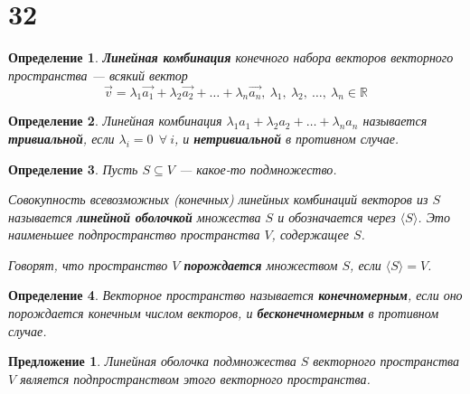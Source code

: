 \documentclass[a4paper,12pt]{article}
\newtheorem*{definition}{Определение}
\newtheorem*{proposal}{Предложение}
\begin{document}
	\section*{32}
	\begin{definition}
		\textbf{Линейная комбинация} конечного набора векторов векторного пространства --- всякий вектор \[\vec v =  \lambda_1\vec{a_1} + \lambda_2\vec{a_2} + \ldots + \lambda_n\vec{a_n},\ \lambda_1,\ \lambda_2,\ \ldots,\ \lambda_n \in \mathbb{R}\] 
	\end{definition}
	\begin{definition}
		Линейная комбинация $\lambda_1 a_1 + \lambda_2 a_2 + \ldots + \lambda_n a_n$ называется \textbf{тривиальной}, если $\lambda_i = 0 \ \ \forall\ i$, и \textbf{нетривиальной} в противном случае.
	\end{definition}
	\begin{definition}
		Пусть $S \subseteq V$ — какое-то подмножество.
		
		Совокупность всевозможных (конечных) линейных комбинаций векторов из $S$ называется \textbf{линейной оболочкой} множества $S$ и обозначается через $\langle S \rangle$. Это наименьшее подпространство пространства $V$, содержащее $S$.
		
		Говорят, что пространство $V$ \textbf{порождается} множеством $S$, если $\langle S \rangle = V$.    
	\end{definition}
	\begin{definition}
		Векторное пространство называется \textbf{конечномерным}, если оно порождается конечным числом векторов, и \textbf{бесконечномерным} в противном случае.
	\end{definition}
	\begin{proposal}
		Линейная оболочка подмножества $S$ векторного пространства $V$ является подпространством этого векторного пространства.
	\end{proposal}
\end{document}
